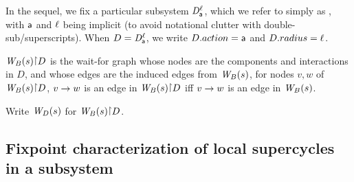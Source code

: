 In the sequel, we fix a particular subsystem $\dsk{\act}{\l}$, which
we refer to simply as \DS, with $\act$ and $\l$ being implicit (to
avoid notational clutter with double-sub/superscripts). 
When $\DS = \dsk{\act}{\l}$, we write $\DS.action = \act$ and
$\DS.radius = \l$. 


\begin{definition} \label{defn:projWgraph}
$\wfg{B}{s} \pj \DS$ is the wait-for graph whose nodes are the
components and interactions in $D$, and whose edges are the induced
edges from $\wfg{B}{s}$, \ie for nodes $v, w$ of $\wfg{B}{s} \pj \DS$,
$v \ar w$ is an edge in $\wfg{B}{s} \pj \DS$ iff $v \ar w$ is an edge in $\wfg{B}{s}$.

Write $\lwfg{B}{s}{\DS}$ for $\wfg{B}{s} \pj \DS$.
\end{definition}


%
\subsection{Fixpoint characterization of  local supercycles in a  subsystem}
\label{s:local.fixpoint}

